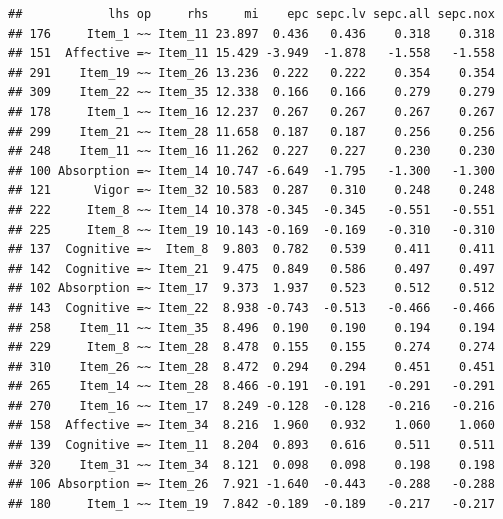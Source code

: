 \documentclass[
  english,
  man]{apa6}
\begin{document}
\begin{verbatim}
##            lhs op     rhs     mi    epc sepc.lv sepc.all sepc.nox
## 176     Item_1 ~~ Item_11 23.897  0.436   0.436    0.318    0.318
## 151  Affective =~ Item_11 15.429 -3.949  -1.878   -1.558   -1.558
## 291    Item_19 ~~ Item_26 13.236  0.222   0.222    0.354    0.354
## 309    Item_22 ~~ Item_35 12.338  0.166   0.166    0.279    0.279
## 178     Item_1 ~~ Item_16 12.237  0.267   0.267    0.267    0.267
## 299    Item_21 ~~ Item_28 11.658  0.187   0.187    0.256    0.256
## 248    Item_11 ~~ Item_16 11.262  0.227   0.227    0.230    0.230
## 100 Absorption =~ Item_14 10.747 -6.649  -1.795   -1.300   -1.300
## 121      Vigor =~ Item_32 10.583  0.287   0.310    0.248    0.248
## 222     Item_8 ~~ Item_14 10.378 -0.345  -0.345   -0.551   -0.551
## 225     Item_8 ~~ Item_19 10.143 -0.169  -0.169   -0.310   -0.310
## 137  Cognitive =~  Item_8  9.803  0.782   0.539    0.411    0.411
## 142  Cognitive =~ Item_21  9.475  0.849   0.586    0.497    0.497
## 102 Absorption =~ Item_17  9.373  1.937   0.523    0.512    0.512
## 143  Cognitive =~ Item_22  8.938 -0.743  -0.513   -0.466   -0.466
## 258    Item_11 ~~ Item_35  8.496  0.190   0.190    0.194    0.194
## 229     Item_8 ~~ Item_28  8.478  0.155   0.155    0.274    0.274
## 310    Item_26 ~~ Item_28  8.472  0.294   0.294    0.451    0.451
## 265    Item_14 ~~ Item_28  8.466 -0.191  -0.191   -0.291   -0.291
## 270    Item_16 ~~ Item_17  8.249 -0.128  -0.128   -0.216   -0.216
## 158  Affective =~ Item_34  8.216  1.960   0.932    1.060    1.060
## 139  Cognitive =~ Item_11  8.204  0.893   0.616    0.511    0.511
## 320    Item_31 ~~ Item_34  8.121  0.098   0.098    0.198    0.198
## 106 Absorption =~ Item_26  7.921 -1.640  -0.443   -0.288   -0.288
## 180     Item_1 ~~ Item_19  7.842 -0.189  -0.189   -0.217   -0.217
\end{verbatim}
\end{document}
